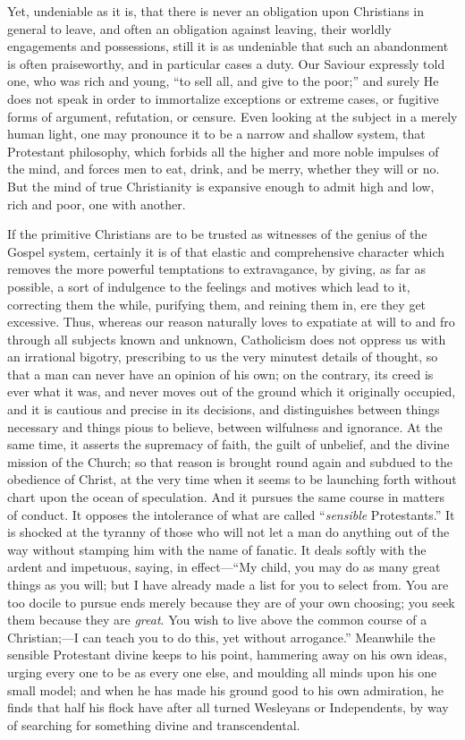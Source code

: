 Yet, undeniable as it is, that there is never an obligation upon
Christians in general to leave, and often an obligation against
leaving, their worldly engagements and possessions, still it is as
undeniable that such an abandonment is often praiseworthy, and in
particular cases a duty. Our Saviour expressly told one, who was rich
and young, ``to sell all, and give to the poor;'' and surely
He does not speak in order to immortalize exceptions or extreme cases,
or fugitive forms of argument, refutation, or censure. Even looking at
the subject in a merely human light, one may pronounce it to be a
narrow and shallow system, that Protestant philosophy, which forbids
all the higher and more noble impulses of the mind, and forces men to
eat, drink, and be merry, whether they will or no. But the mind of
true Christianity is expansive enough to admit high and low, rich and
poor, one with another.

If the primitive Christians are to be trusted as witnesses of the
genius of the Gospel system, certainly it is of that elastic and
comprehensive character which removes the more powerful temptations to
extravagance, by giving, as far as possible, a sort of indulgence to
the feelings and motives which lead to it, correcting them the while,
purifying them, and reining them in, ere they get excessive. Thus,
whereas our reason naturally loves to expatiate at will to and fro
through all subjects known and unknown, Catholicism does not oppress
us with an irrational bigotry, prescribing to us the very minutest
details of thought, so that a man can never have an opinion of his
own; on the contrary, its creed is ever what it was, and never moves
out of the ground which it originally occupied, and it is cautious and
precise in its decisions, and distinguishes between things
necessary and things pious to believe, between wilfulness and
ignorance. At the same time, it asserts the supremacy of faith, the
guilt of unbelief, and the divine mission of the Church; so that
reason is brought round again and subdued to the obedience of Christ,
at the very time when it seems to be launching forth without chart
upon the ocean of speculation. And it pursues the same course in
matters of conduct. It opposes the intolerance of what are called
``\emph{sensible} Protestants.'' It is shocked at the tyranny
of those who will not let a man do anything out of the way without
stamping him with the name of fanatic. It deals softly with the ardent
and impetuous, saying, in effect—``My child, you may do as many
great things as you will; but I have already made a list for you to
select from. You are too docile to pursue ends merely because they are
of your own choosing; you seek them because they are \emph{great}. You
wish to live above the common course of a Christian;—I can teach you
to do this, yet without arrogance.'' Meanwhile the sensible
Protestant divine keeps to his point, hammering away on his own ideas,
urging every one to be as every one else, and moulding all minds upon
his one small model; and when he has made his ground good to his own
admiration, he finds that half his flock have after all turned
Wesleyans or Independents, by way of searching for something divine
and transcendental.

